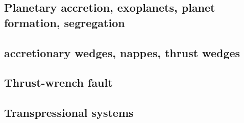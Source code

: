 \subsection*{Planetary accretion, exoplanets, planet formation, segregation}

\noindent
\cite{lejm08}
\cite{ligt09}\cite{gogk09}
\cite{ligt11}\cite{vacg11}
\cite{gobg14}\cite{yadl14}
\cite{neum19}




\subsection*{accretionary wedges, nappes, thrust wedges} 

\noindent
\cite{stoc83}\cite{dasd83}
\cite{dahl84}\cite{dasd84}
\cite{dahl90}
\cite{koon94}
\cite{wiep03}
\cite{rugb13}
\cite{mauw16}
\cite{mauw17}\cite{rugb17}
\cite{elgb19}

\subsection*{Thrust-wrench fault} 

\noindent
\cite{rods15}

\subsection*{Transpressional systems} 

\noindent
\cite{tite94}
\cite{thsj97}
\cite{konc03}\cite{upke03}
\cite{legs11}
\cite{naam17}\cite{rugb17}
\cite{naam18}

